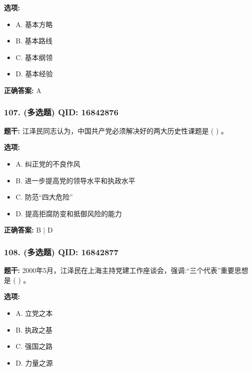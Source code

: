 \documentclass[12pt,UTF8]{ctexart}
\begin{document}
\textbf{选项:}
\begin{itemize}[leftmargin=*]

  \item A. 基本方略

  \item B. 基本路线

  \item C. 基本纲领

  \item D. 基本经验

\end{itemize}

\textbf{正确答案:}
A

\vspace{0.3em}\hrulefill\vspace{0.7em}

\subsubsection*{107. (多选题) \small QID: 16842876}

\textbf{题干:}
江泽民同志认为，中国共产党必须解决好的两大历史性课题是 ( ) 。

\textbf{选项:}
\begin{itemize}[leftmargin=*]

  \item A. 纠正党的不良作风

  \item B. 进一步提高党的领导水平和执政水平

  \item C. 防范“四大危险”

  \item D. 提高拒腐防变和抵御风险的能力

\end{itemize}

\textbf{正确答案:}
B | D

\vspace{0.3em}\hrulefill\vspace{0.7em}

\subsubsection*{108. (多选题) \small QID: 16842877}

\textbf{题干:}
2000年5月，江泽民在上海主持党建工作座谈会，强调:“三个代表”重要思想是 ( ) 。

\textbf{选项:}
\begin{itemize}[leftmargin=*]

  \item A. 立党之本

  \item B. 执政之基

  \item C. 强国之路

  \item D. 力量之源

\end{itemize}
\end{document}
